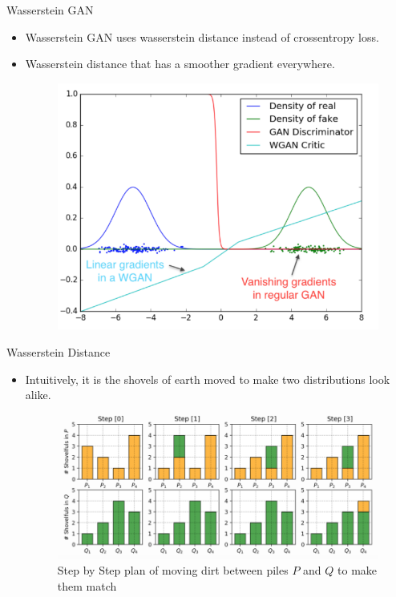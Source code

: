 \begin{frame}[allowframebreaks]{Wasserstein GAN}
\begin{itemize}
    \item Wasserstein GAN uses wasserstein distance instead of crossentropy loss.
    \item Wasserstein distance that has a smoother gradient everywhere.
        \begin{figure}
            \centering
            \includegraphics[height=0.6\textheight, width=\textwidth, keepaspectratio]{images/gan/wgan_1.png}
        \end{figure}
\end{itemize}
    
\end{frame}

\begin{frame}{Wasserstein Distance}
\begin{itemize}
    \item Intuitively, it is the shovels of earth moved to make two distributions look alike.
    \begin{figure}
        \centering
        \includegraphics[height=0.6\textheight, width=\textwidth, keepaspectratio]{images/gan/wgan_2.png}
        \caption{Step by Step plan of moving dirt between piles $P$ and $Q$ to make them match}
    \end{figure}
    
\end{itemize}
    
\end{frame}


